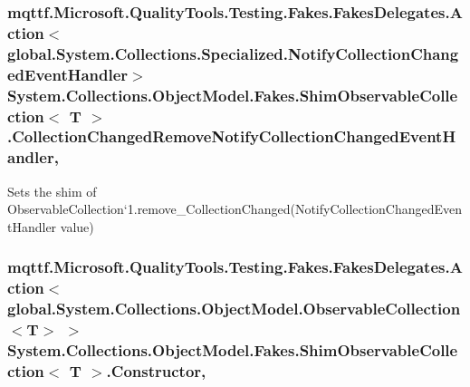 \hypertarget{class_system_1_1_collections_1_1_object_model_1_1_fakes_1_1_shim_observable_collection_3_01_t_01_4_a4dbe18918084a7bf9c10c81f3ac77273}{
\subsubsection[{Collection\-Changed\-Remove\-Notify\-Collection\-Changed\-Event\-Handler}]{\setlength{\rightskip}{0pt plus 5cm}mqttf.\-Microsoft.\-Quality\-Tools.\-Testing.\-Fakes.\-Fakes\-Delegates.\-Action$<$global.\-System.\-Collections.\-Specialized.\-Notify\-Collection\-Changed\-Event\-Handler$>$ System.\-Collections.\-Object\-Model.\-Fakes.\-Shim\-Observable\-Collection$<$ T $>$.Collection\-Changed\-Remove\-Notify\-Collection\-Changed\-Event\-Handler\hspace{0.3cm}{\ttfamily [set]}, {\ttfamily [remove]}}}\label{class_system_1_1_collections_1_1_object_model_1_1_fakes_1_1_shim_observable_collection_3_01_t_01_4_a4dbe18918084a7bf9c10c81f3ac77273}


Sets the shim of Observable\-Collection`1.remove\-\_\-\-Collection\-Changed(\-Notify\-Collection\-Changed\-Event\-Handler value)

\hypertarget{class_system_1_1_collections_1_1_object_model_1_1_fakes_1_1_shim_observable_collection_3_01_t_01_4_ad9d28ab360594cef0b9ce0d4d2653d72}{
\subsubsection[{Constructor}]{\setlength{\rightskip}{0pt plus 5cm}mqttf.\-Microsoft.\-Quality\-Tools.\-Testing.\-Fakes.\-Fakes\-Delegates.\-Action$<$global.\-System.\-Collections.\-Object\-Model.\-Observable\-Collection$<$T$>$ $>$ System.\-Collections.\-Object\-Model.\-Fakes.\-Shim\-Observable\-Collection$<$ T $>$.Constructor\hspace{0.3cm}{\ttfamily [static]}, {\ttfamily [set]}}}\label{class_system_1_1_collections_1_1_object_model_1_1_fakes_1_1_shim_observable_collection_3_01_t_01_4_ad9d28ab360594cef0b9ce0d4d2653d72}


